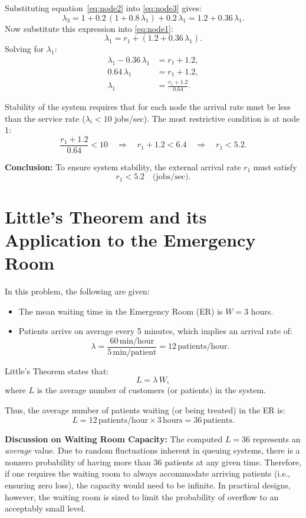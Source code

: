 \documentclass[12pt]{article}
\begin{document}
Substituting equation~\eqref{eq:node2} into \eqref{eq:node3} gives:
\[
\lambda_3 = 1 + 0.2\,(1+0.8\,\lambda_1) + 0.2\,\lambda_1 = 1.2 + 0.36\,\lambda_1.
\]
Now substitute this expression into \eqref{eq:node1}:
\[
\lambda_1 = r_1 + (1.2 + 0.36\,\lambda_1).
\]
Solving for \(\lambda_1\):
\begin{align*}
    \lambda_1 - 0.36\,\lambda_1 &= r_1 + 1.2,\\[1mm]
    0.64\,\lambda_1 &= r_1 + 1.2,\\[1mm]
    \lambda_1 &= \frac{r_1 + 1.2}{0.64}.
\end{align*}

Stability of the system requires that for each node the arrival rate must be less than the service rate (\(\lambda_i < 10\) jobs/sec). The most restrictive condition is at node 1:
\[
\frac{r_1 + 1.2}{0.64} < 10 \quad \Rightarrow \quad r_1 + 1.2 < 6.4 \quad \Rightarrow \quad r_1 < 5.2.
\]

\textbf{Conclusion:} To ensure system stability, the external arrival rate \(r_1\) must satisfy
\[
r_1 < 5.2 \quad \text{(jobs/sec)}.
\]

\section{Little's Theorem and its Application to the Emergency Room}

In this problem, the following are given:
\begin{itemize}
    \item The mean waiting time in the Emergency Room (ER) is \(W = 3\) hours.
    \item Patients arrive on average every 5 minutes, which implies an arrival rate of:
          \[
          \lambda = \frac{60 \, \text{min/hour}}{5 \, \text{min/patient}} = 12 \, \text{patients/hour}.
          \]
\end{itemize}

Little’s Theorem states that:
\[
L = \lambda\,W,
\]
where \(L\) is the average number of customers (or patients) in the system.

Thus, the average number of patients waiting (or being treated) in the ER is:
\[
L = 12\,\text{patients/hour} \times 3\,\text{hours} = 36\,\text{patients}.
\]

\textbf{Discussion on Waiting Room Capacity:}  
The computed \(L = 36\) represents an \emph{average} value. Due to random fluctuations inherent in queuing systems, there is a nonzero probability of having more than 36 patients at any given time. Therefore, if one requires the waiting room to always accommodate arriving patients (i.e., ensuring zero loss), the capacity would need to be infinite. In practical designs, however, the waiting room is sized to limit the probability of overflow to an acceptably small level.
\end{document}
